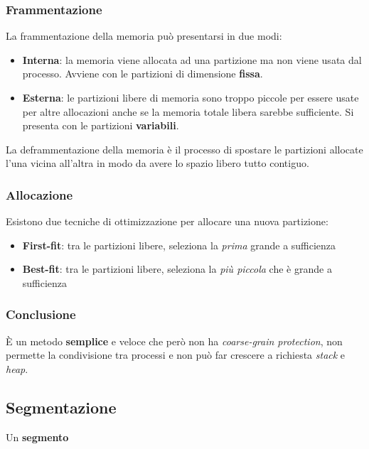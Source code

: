 \subsubsection{Frammentazione}
La frammentazione della memoria può presentarsi in due modi:
\begin{itemize}
	\item \textbf{Interna}: la memoria viene allocata ad una partizione ma non viene usata dal processo. Avviene con le partizioni di dimensione \textbf{fissa}.
	\item \textbf{Esterna}: le partizioni libere di memoria sono troppo piccole per essere usate per altre allocazioni anche se la memoria totale libera sarebbe sufficiente. Si presenta con le partizioni \textbf{variabili}.
\end{itemize}
\begin{definition}[Deframmentazione]
	La deframmentazione della memoria è il processo di spostare le partizioni allocate l'una vicina all'altra in modo da avere lo spazio libero tutto contiguo.
\end{definition}
\subsubsection{Allocazione}
Esistono due tecniche di ottimizzazione per allocare una nuova partizione:
\begin{itemize}
	\item \textbf{First-fit}: tra le partizioni libere, seleziona la \textit{prima} grande a sufficienza
	\item \textbf{Best-fit}: tra le partizioni libere, seleziona la \textit{più piccola} che è grande a sufficienza
\end{itemize}
\subsubsection{Conclusione}
È un metodo \textbf{semplice} e veloce che però non ha \textit{coarse-grain protection}, non permette la condivisione tra processi e non può far crescere a richiesta \textit{stack} e \textit{heap}.

\subsection{Segmentazione}
Un \textbf{segmento}